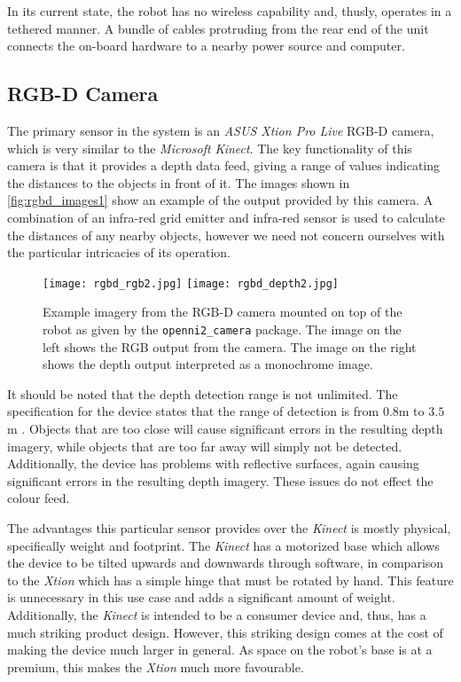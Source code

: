 In its current state, the robot has no wireless capability and, thusly, operates in a tethered manner. A bundle of cables protruding from the rear end of the unit connects the on-board hardware to a nearby power source and computer.

\subsection{RGB-D Camera}
The primary sensor in the system is an \emph{ASUS Xtion Pro Live} RGB-D camera, which is very similar to the \emph{Microsoft Kinect}. The key functionality of this camera is that it provides a depth data feed, giving a range of values indicating the distances to the objects in front of it. The images shown in \autoref{fig:rgbd_images1} show an example of the output provided by this camera. A combination of an infra-red grid emitter and infra-red sensor is used to calculate the distances of any nearby objects, however we need not concern ourselves with the particular intricacies of its operation.

\begin{figure}[!h]
    \centering
    \texttt{[image: rgbd\_rgb2.jpg]}
    \texttt{[image: rgbd\_depth2.jpg]}
    \caption{Example imagery from the RGB-D camera mounted on top of the robot as given by the \texttt{openni2\_camera} package. The image on the left shows the RGB output from the camera. The image on the right shows the depth output interpreted as a monochrome image.}
    \label{fig:rgbd_images1}
\end{figure}

It should be noted that the depth detection range is not unlimited. The specification for the device states that the range of detection is from $0.8$m to $3.5$m \cite{xtion_spec}. Objects that are too close will cause significant errors in the resulting depth imagery, while objects that are too far away will simply not be detected. Additionally, the device has problems with reflective surfaces, again causing significant errors in the resulting depth imagery. These issues do not effect the colour feed.

The advantages this particular sensor provides over the \emph{Kinect} is mostly physical, specifically weight and footprint. The \emph{Kinect} has a motorized base which allows the device to be tilted upwards and downwards through software, in comparison to the \emph{Xtion} which has a simple hinge that must be rotated by hand. This feature is unnecessary in this use case and adds a significant amount of weight. Additionally, the \emph{Kinect} is intended to be a consumer device and, thus, has a much striking product design. However, this striking design comes at the cost of making the device much larger in general. As space on the robot's base is at a premium, this makes the \emph{Xtion} much more favourable.


